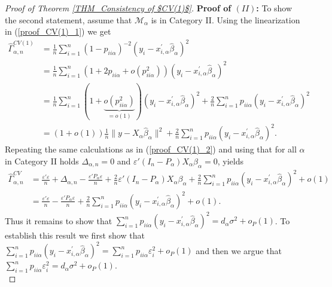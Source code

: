 \documentclass[Research_Module_ES.tex]{subfiles}
\begin{document}
\begin{proof}[Proof of Theorem \ref{THM_Consistency of $CV(1)$}]
	\textbf{Proof of $(II)$:} To show the second statement, assume that $\mathcal{M}_\alpha$ is in Category II.
	Using the linearization in (\ref{proof_CV(1)_1}) we get
	\begin{align*}
	\hat{\Gamma}_{\alpha,n}^{CV(1)} &= \frac{1}{n}\sum_{i=1}^n (1- p_{ii\alpha})^{-2}(y_i-x_{i,\alpha}^\prime\hat{\beta}_\alpha)^2\\
	&= \frac{1}{n}\sum_{i=1}^n (1+2p_{ii\alpha} + o(p_{ii\alpha}^2))(y_i-x_{i,\alpha}^\prime\hat{\beta}_\alpha)^2\\
	&=\frac{1}{n}\sum_{i=1}^n (1 + \underbrace{o(p_{ii\alpha}^2)}_{=o(1)})(y_i-x_{i,\alpha}^\prime\hat{\beta}_\alpha)^2+\frac{2}{n}\sum_{i=1}^n p_{ii\alpha}(y_i-x_{i,\alpha}^\prime\hat{\beta}_\alpha)^2\\
	&= (1+o(1))\frac{1}{n}\lVert y-X_{\alpha}\hat{\beta}_\alpha\rVert^2 + \frac{2}{n}\sum_{i=1}^n p_{ii\alpha}(y_i-x_{i,\alpha}^\prime\hat{\beta}_\alpha)^2. 
	\end{align*}
	Repeating the same calculations as in (\ref{proof_CV(1)_2}) and using that for all $\alpha$ in Category II holds $\Delta_{\alpha,n}=0$ and $\varepsilon'(I_n-P_\alpha)X_\alpha\beta_\alpha =0$, yields
	\begin{align*}
	\hat{\Gamma}_{\alpha,n}^{CV} &=\frac{\varepsilon'\varepsilon}{n} + \Delta_{\alpha,n} - \frac{\varepsilon'P_\alpha\varepsilon}{n} +\frac{2}{n}\varepsilon'(I_n-P_\alpha) X_\alpha\beta_\alpha+ \frac{2}{n}\sum_{i=1}^n p_{ii\alpha}(y_i-x_{i,\alpha}^\prime\hat{\beta}_\alpha)^2 +o(1)\\
	&= \frac{\varepsilon'\varepsilon}{n}- \frac{\varepsilon'P_\alpha\varepsilon}{n} + \frac{2}{n}\sum_{i=1}^n p_{ii\alpha}(y_i-x_{i,\alpha}^\prime\hat{\beta}_\alpha)^2 +o(1).
	\end{align*}
	Thus it remains to show that $\sum_{i=1}^n p_{ii\alpha}(y_i-x_{i,\alpha}^\prime\hat{\beta}_\alpha)^2= d_\alpha \sigma^2 + o_P(1)$.
	To establish this result we first show that $\sum_{i=1}^n p_{ii\alpha}(y_i-x_{i,\alpha}^\prime\hat{\beta}_\alpha)^2= \sum_{i=1}^n p_{ii\alpha}\varepsilon_i^2 + o_P(1)$ and then we argue that $\sum_{i=1}^n p_{ii\alpha}\varepsilon_i^2=d_\alpha\sigma^2+o_P(1)$.\\
	

\end{proof}
\end{document}
